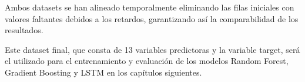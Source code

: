 Ambos datasets se han alineado temporalmente eliminando las filas iniciales con valores faltantes debidos a los retardos, garantizando así la comparabilidad de los resultados.

Este dataset final, que consta de 13 variables predictoras y la variable target, será el utilizado para el entrenamiento y evaluación de los modelos Random Forest, Gradient Boosting y LSTM en los capítulos siguientes.